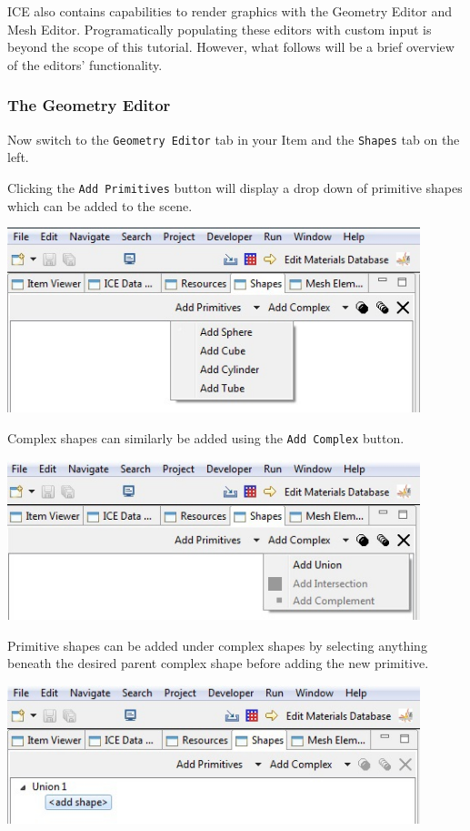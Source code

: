 ICE also contains capabilities to render graphics with the Geometry Editor and
Mesh Editor. Programatically populating these editors with custom input is
beyond the scope of this tutorial. However, what follows will be a brief
overview of the editors' functionality.

\subsubsection{The Geometry Editor}

Now switch to the \texttt{Geometry Editor} tab in your Item and the
\texttt{Shapes} tab on the left.

Clicking the \texttt{Add Primitives} button will display a drop down of
primitive shapes which can be added to the scene.

\begin{center}
\includegraphics[width=12cm]{images/AddPrimitiveShape}
\end{center}

Complex shapes can similarly be added using the \texttt{Add Complex} button.

\begin{center}
\includegraphics[width=12cm]{images/AddComplexShape}
\end{center}

Primitive shapes can be added under complex shapes by selecting anything beneath
the desired parent complex shape before adding the new primitive.

\begin{center}
\includegraphics[width=12cm]{images/ComplexShapeTree}
\end{center}

